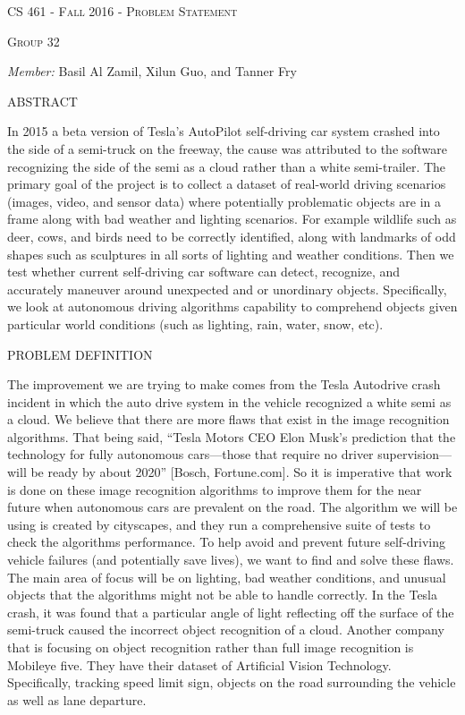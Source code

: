 \documentclass[letterpaper,10pt]{article}
\begin{document}
\begin{titlepage}
\begin{center}
    \textsc{\LARGE CS 461 - Fall 2016 - Problem Statement}

    \textsc{Group 32}

    \emph{Member:}
    Basil Al Zamil,
    Xilun Guo, and
    Tanner Fry
    \setlength{\parskip}{20pt}

\textsc{ \large  ABSTRACT}
\end{center}

In 2015 a beta version of Tesla’s AutoPilot self-driving car system crashed into the side of a semi-truck on the freeway, the cause was attributed to the software recognizing the side of the semi as a cloud rather than a white semi-trailer. The primary goal of the project is to collect a dataset of real-world driving scenarios (images, video, and sensor data) where potentially problematic objects are in a frame along with bad weather and lighting scenarios. For example wildlife such as deer, cows, and birds need to be correctly identified, along with landmarks of odd shapes such as sculptures in all sorts of lighting and weather conditions. Then we test whether current self-driving car software can detect, recognize, and accurately maneuver around unexpected and or unordinary objects. Specifically, we look at autonomous driving algorithms capability to comprehend objects given particular world conditions (such as lighting, rain, water, snow, etc). 
\end{titlepage}

\newpage

\textsc{\large PROBLEM DEFINITION}

The improvement we are trying to make comes from the Tesla Autodrive crash incident in which the auto drive system in the vehicle recognized a white semi as a cloud. We believe that there are more flaws that exist in the image recognition algorithms. That being said, “Tesla Motors CEO Elon Musk’s prediction that the technology for fully autonomous cars—those that require no driver supervision—will be ready by about 2020” [Bosch, Fortune.com]. So it is imperative that work is done on these image recognition algorithms to improve them for the near future when autonomous cars are prevalent on the road. The algorithm we will be using is created by cityscapes, and they run a comprehensive suite of tests to check the algorithms performance. To help avoid and prevent future self-driving vehicle failures (and potentially save lives), we want to find and solve these flaws. The main area of focus will be on lighting, bad weather conditions, and unusual objects that the algorithms might not be able to handle correctly. In the Tesla crash, it was found that a particular angle of light reflecting off the surface of the semi-truck caused the incorrect object recognition of a cloud. Another company that is focusing on object recognition rather than full image recognition is Mobileye five. They have their dataset of Artificial Vision Technology. Specifically, tracking speed limit sign, objects on the road surrounding the vehicle as well as lane departure. 
\end{document}
